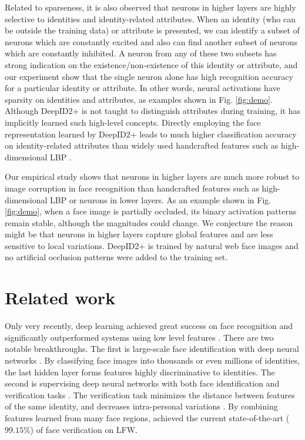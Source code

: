 \documentclass[10pt,twocolumn,letterpaper]{article}
\begin{document}
Related to sparseness, it is also observed that neurons in higher layers are highly selective to identities and identity-related attributes. When an identity (who can be outside the training data) or attribute is presented, we can identify a subset of neurons which are constantly excited and also can find another subset of neurons which are constantly inhibited. A neuron from any of these two subsets has strong indication on the existence/non-existence of this identity or attribute, and our experiment show that the single neuron alone has high recognition accuracy for a particular identity or attribute. In other words, neural activations have sparsity on identities and attributes, as examples shown in Fig. \ref{fig:demo}. Although  DeepID2+  is not taught to distinguish attributes during training, it has implicitly learned such high-level concepts. Directly employing the face representation learned by DeepID2+ leads to much higher classification accuracy on identity-related attributes than widely used handcrafted features such as high-dimensional LBP \cite{chen2013,cao2013}.

Our empirical study shows that neurons in higher layers are much more robust to image corruption in face recognition than handcrafted features such as high-dimensional LBP or neurons in lower layers. As an example shown in Fig. \ref{fig:demo}, when a face image is partially occluded, its binary activation patterns remain stable, although the magnitudes could change. We conjecture the reason might be that neurons in higher layers capture global features and are less sensitive to local variations. DeepID2+ is trained by natural web face images and no artificial occlusion patterns were added to the training set.


\section{Related work}

Only very recently, deep learning  achieved great success on face recognition \cite{zhu2013,taigman2014a,sun2014a,sun2014b,taigman2014b} and significantly outperformed systems using low level features \cite{kumar2009,taigman2009,guillaumin2009,yin2011,huang2011,chen2012,berg2012,simonyan2013,chen2013,cao2013}. There are two notable breakthroughs. The first is large-scale face identification with deep neural networks \cite{taigman2014a,sun2014a,taigman2014b}. By classifying face images into thousands or even millions of identities, the last hidden layer  forms features highly discriminative to identities. The second is supervising deep neural networks with both face identification and verification tasks \cite{sun2014b}. The verification task minimizes the distance between features of the same identity, and decreases  intra-personal variations \cite{sun2014b}. By combining features learned  from many face regions, \cite{sun2014b} achieved the current state-of-the-art ($99.15\%$) of face verification on LFW.
\end{document}
